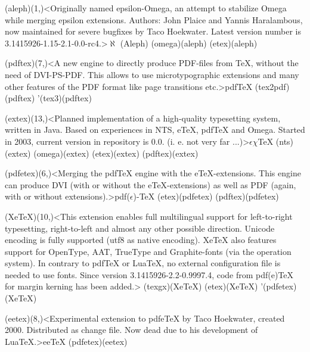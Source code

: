 {	\steplayer[-1]

	\tonode(aleph)(1,\layer)<Originally named epsilon-Omega, an attempt to stabilize Omega while merging epsilon extensions. Authors: John Plaice and Yannis Haralambous, now maintained for severe bugfixes by Taco Hoekwater. Latest version number is 3.1415926-1.15-2.1-0.0-rc4.>{$\aleph$ (Aleph)}
		\todraw(omega)(aleph)
		\todraw(etex)(aleph)
	
	\tonode[\vip](pdftex)(7,\layer)<A new engine to directly produce PDF-files from TeX, without the need of DVI-PS-PDF. This allows to use microtypographic extensions and many other features of the PDF format like page transitions etc.>{pdf\TeX}
		\todraw(tex2pdf)(pdftex)
		\todraw'(tex3)(pdftex)
	
	\steplayer[-1]

	\tonode[\experimental](extex)(13,\layer)<Planned implementation of a high-quality typesetting system, written in Java. Based on experiences in NTS, eTeX, pdfTeX and Omega. Started in 2003, current version in repository is 0.0. (i. e. not very far ...)>{$\epsilon\chi$\TeX}
		\todraw(nts)(extex)
		\todraw(omega)(extex)
		\todraw(etex)(extex)
		\todraw(pdftex)(extex)

	\steplayer[-1]
	
	\tonode[\vip](pdfetex)(6,\layer)<Merging the pdfTeX engine with the eTeX-extensions. This engine can produce DVI (with or without the eTeX-extensions) as well as PDF (again, with or without extensions).>{pdf($\epsilon$)-\TeX}
		\todraw*(etex)(pdfetex)
		\todraw*(pdftex)(pdfetex)

	\tonode[\vip](XeTeX)(10,\layer)<This extension enables full multilingual support for left-to-right typesetting, right-to-left and almost any other possible direction. Unicode encoding is fully supported (utf8 as native encoding). XeTeX also features support for OpenType, AAT, TrueType and Graphite-fonts (via the operation system). In contrary to pdfTeX or LuaTeX, no external configuration file is needed to use fonts. Since version 3.1415926-2.2-0.9997.4, code from pdf(e)TeX for margin kerning has been added.>{\XeTeX}
		\todraw(texgx)(XeTeX)
		\todraw*(etex)(XeTeX)
		\todraw'(pdfetex)(XeTeX)
	
	\steplayer[-2]

	\tonode[\experimental](eetex)(8,\layer)<Experimental extension to pdfeTeX by Taco Hoekwater, created 2000. Distributed as change file. Now dead due to his development of LuaTeX.>{ee\TeX}
		\todraw(pdfetex)(eetex)
	
	\steplayer[-1]

}
